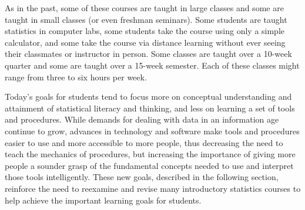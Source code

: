 As in the past, some of these courses are taught in large classes and some are taught in small classes (or even freshman seminars). Some students are taught statistics in computer labs, some students take the course using only a simple calculator, and some take the course via distance learning without ever seeing their classmates or instructor in person.  Some classes are taught over a 10-week quarter and some are taught over a 15-week semester. Each of these classes might range from three to six hours per week.
 
Today's goals for students tend to focus more on conceptual understanding and attainment of statistical literacy and thinking, and less on learning a set of tools and procedures. While demands for dealing with data in an information age continue to grow, advances in technology and software make tools and procedures easier to use and more accessible to more people, thus decreasing the need to teach the mechanics of procedures, but increasing the importance of giving more people a sounder grasp of the fundamental concepts needed to use and interpret those tools intelligently. These new goals, described in the following section, reinforce the need to reexamine and revise many introductory statistics courses to help achieve the important learning goals for students.


